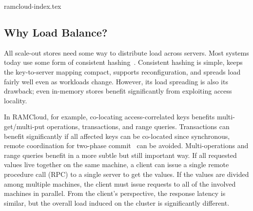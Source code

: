  {ramcloud-index.tex}

%


\subsection{Why Load Balance?}
\label{sec:why-balance}

All scale-out stores need some way to distribute load across servers.
Most systems today use
some form of consistent
hashing~\cite{chord,dynamo,cassandra}. Consistent hashing is simple,
keeps the key-to-server mapping compact, supports reconfiguration, and
spreads load fairly well even as workloads change. However, its
load spreading is also its drawback; even in-memory stores benefit
significantly from exploiting access locality.

In RAMCloud, for example, co-locating access-correlated keys benefits
multi-get/multi-put operations, transactions, and range queries. Transactions can
benefit significantly if all affected keys can be co-located since
synchronous, remote
coordination for two-phase commit~\cite{ramcloud-rifl,sinfonia} can be avoided.
Multi-operations and range queries benefit in a more subtle but still important
way. If all requested values live together on the same machine, a client can
issue a single remote procedure call (RPC) to a single server to get
the values. If the values are divided among multiple machines, the client must
issue requests to all of the involved machines in parallel. From the client's
perspective, the response latency is similar, but the overall load
induced on the cluster is significantly different.

